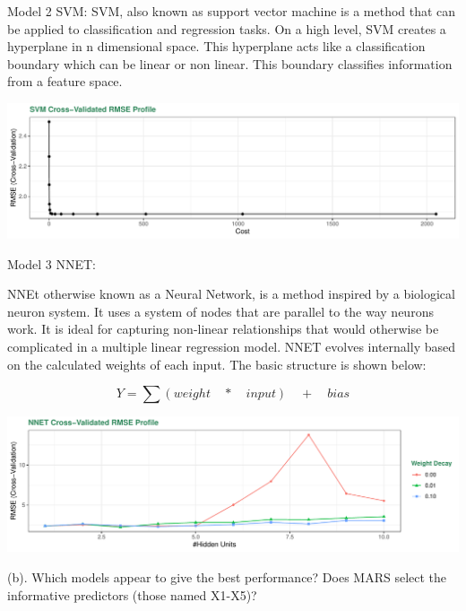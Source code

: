 \documentclass[]{report}
\begin{document}
Model 2 SVM: SVM, also known as support vector machine is a method that
can be applied to classification and regression tasks. On a high level,
SVM creates a hyperplane in n dimensional space. This hyperplane acts
like a classification boundary which can be linear or non linear. This
boundary classifies information from a feature space.

\includegraphics{Homework-Two_files/figure-latex/kj-7.2-2-1.pdf}

Model 3 NNET:

NNEt otherwise known as a Neural Network, is a method inspired by a
biological neuron system. It uses a system of nodes that are parallel to
the way neurons work. It is ideal for capturing non-linear relationships
that would otherwise be complicated in a multiple linear regression
model. NNET evolves internally based on the calculated weights of each
input. The basic structure is shown below:

\[
Y=\sum { (weight\quad *\quad input)\quad +\quad bias } 
\]

\includegraphics{Homework-Two_files/figure-latex/kj-7.2-3-1.pdf}

\begin{subquestion}{(b).}
Which models appear to give the best performance? Does MARS select the informative predictors (those named X1-X5)?
\end{subquestion}
\end{document}
